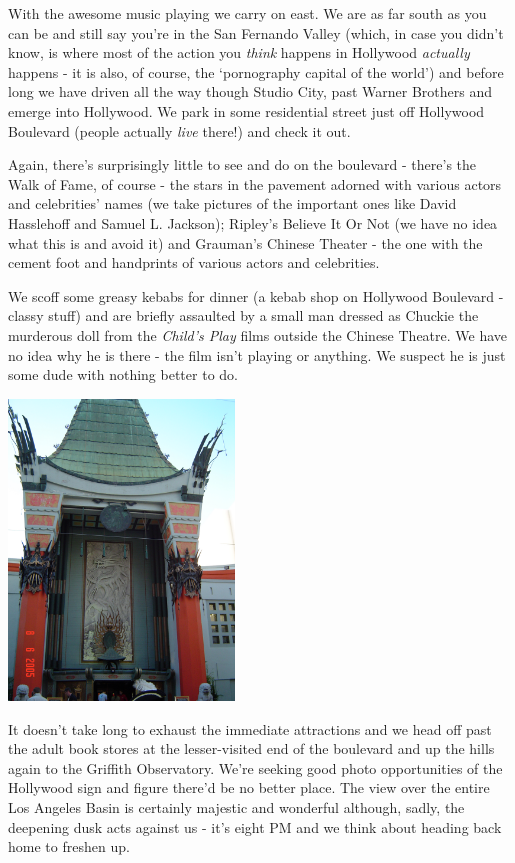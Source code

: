 \documentclass[a5paper,titlepage,11pt]{book}
\begin{document}
With the awesome music playing we carry on east.  We are as far south as you can be and still say you're in the San Fernando Valley (which, in case you didn't know, is where most of the action you \emph{think} happens in Hollywood \emph{actually} happens - it is also, of course, the `pornography capital of the world') and before long we have driven all the way though Studio City, past Warner Brothers and emerge into Hollywood.  We park in some residential street just off Hollywood Boulevard (people actually \emph{live} there!) and check it out.

Again, there's surprisingly little to see and do on the boulevard - there's the Walk of Fame, of course - the stars in the pavement adorned with various actors and celebrities' names (we take pictures of the important ones like David Hasslehoff and Samuel L. Jackson); Ripley's Believe It Or Not (we have no idea what this is and avoid it) and Grauman's Chinese Theater - the one with the cement foot and handprints of various actors and celebrities.

We scoff some greasy kebabs for dinner (a kebab shop on Hollywood Boulevard - classy stuff) and are briefly assaulted by a small man dressed as Chuckie the murderous doll from the \emph{Child's Play} films outside the Chinese Theatre.  We have no idea why he is there - the film isn't playing or anything.  We suspect he is just some dude with nothing better to do.

\begin{center}\includegraphics[height=80mm]{gfx/DSC00806}\end{center}

It doesn't take long to exhaust the immediate attractions and we head off past the adult book stores at the lesser-visited end of the boulevard and up the hills again to the Griffith Observatory.  We're seeking good photo opportunities of the Hollywood sign and figure there'd be no better place.  The view over the entire Los Angeles Basin is certainly majestic and wonderful although, sadly, the deepening dusk acts against us - it's eight PM and we think about heading back home to freshen up.
\end{document}
